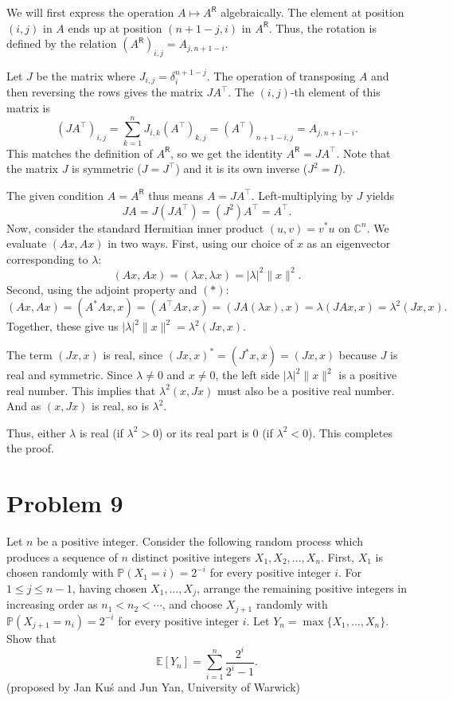 \documentclass{article}
\begin{document}
We will first express the operation $A \mapsto A^{\mathsf{R}}$ algebraically. The element at position $(i,j)$ in $A$ ends up at position $(n+1-j, i)$ in $A^{\mathsf{R}}$. Thus, the rotation is defined by the relation $(A^{\mathsf{R}})_{i,j} = A_{j, n+1-i}$.

Let $J$ be the matrix where $J_{i,j} = \delta_i^{n+1-j}$. The operation of transposing $A$ and then reversing the rows gives the matrix $J A^{\top}$. The $(i,j)$-th element of this matrix is
\[
(J A^{\top})_{i,j} = \sum_{k=1}^n J_{i,k} (A^{\top})_{k,j} = (A^{\top})_{n+1-i, j} = A_{j, n+1-i}.
\]
This matches the definition of $A^{\mathsf{R}}$, so we get the identity $A^{\mathsf{R}} = J A^{\top}$. Note that the matrix $J$ is symmetric ($J = J^{\top}$) and it is its own inverse ($J^2 = I$).

The given condition $A = A^{\mathsf{R}}$ thus means $A = J A^{\top}$. Left-multiplying by $J$ yields
\begin{equation}
J A = J (J A^{\top}) = (J^2) A^{\top} = A^{\top}. \tag{$*$}
\end{equation}
Now, consider the standard Hermitian inner product $(u, v) = v^* u$ on $\mathbb{C}^n$. We evaluate $(A x, A x)$ in two ways. First, using our choice of $x$ as an eigenvector corresponding to $\lambda$:
\[
(A x, A x) = (\lambda x, \lambda x) = |\lambda|^2 \|x\|^2.
\]
Second, using the adjoint property and $(*)$:
\[
(A x, A x) = (A^* A x, x) = (A^{\top} A x, x) = (J A (\lambda x), x) = \lambda (J A x, x) = \lambda^2 (J x, x).
\]
Together, these give us $|\lambda|^2 \|x\|^2 = \lambda^2 (J x, x)$.

The term $(J x, x)$ is real, since $(J x, x)^* = (J^* x, x) = (J x, x)$ because $J$ is real and symmetric. Since $\lambda \neq 0$ and $x \neq 0$, the left side $|\lambda|^2 \|x\|^2$ is a positive real number. This implies that $\lambda^2 (x, J x)$ must also be a positive real number. And as $(x, J x)$ is real, so is $\lambda^2$.

Thus, either $\lambda$ is real (if $\lambda^2 > 0$) or its real part is $0$ (if $\lambda^2 < 0$). This completes the proof.

\section*{Problem 9}
Let $n$ be a positive integer. Consider the following random process which produces a sequence of $n$ distinct positive integers $X_1, X_2, \ldots, X_n$. First, $X_1$ is chosen randomly with $\mathbb{P}(X_1 = i) = 2^{-i}$ for every positive integer $i$. For $1 \leq j \leq n-1$, having chosen $X_1, \ldots, X_j$, arrange the remaining positive integers in increasing order as $n_1 < n_2 < \cdots$, and choose $X_{j+1}$ randomly with $\mathbb{P}(X_{j+1} = n_i) = 2^{-i}$ for every positive integer $i$. Let $Y_n = \max\{X_1, \ldots, X_n\}$. Show that
\[
\mathbb{E}[Y_n] = \sum_{i=1}^n \frac{2^i}{2^i - 1}.
\]
(proposed by Jan Kuś and Jun Yan, University of Warwick)
\end{document}
